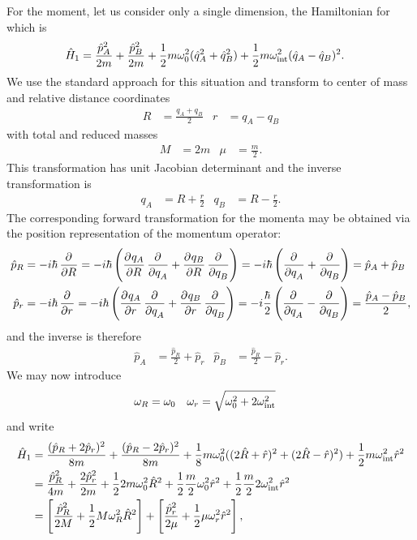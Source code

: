 For the moment, let us consider only a single dimension, the Hamiltonian for which is
\begin{align}
	\hat{H}_1
	&= \frac{\hat{p}_A^2}{2 m} + \frac{\hat{p}_B^2}{2 m}
		+ \frac{1}{2} m \omega_0^2 (\hat{q}_A^2 + \hat{q}_B^2)
		+ \frac{1}{2} m \omega_\text{int}^2 (\hat{q}_A - \hat{q}_B)^2.
\end{align}
We use the standard approach for this situation and transform to center of mass and relative distance coordinates
\begin{align}
	R
	&= \frac{q_A + q_B}{2}
	&
	r
	&= q_A - q_B
		\label{eq:oscillators-Rr}
\end{align}
with total and reduced masses
\begin{align}
	M
	&= 2 m
	&
	\mu
	&= \frac{m}{2}.
\end{align}
This transformation has unit Jacobian determinant and the inverse transformation is
\begin{align}
	q_A
	&= R + \frac{r}{2}
	&
	q_B
	&= R - \frac{r}{2}.
\end{align}
The corresponding forward transformation for the momenta may be obtained via the position representation of the momentum operator:
\begin{subequations}
\begin{align}
	\hat{p}_R
	&= -i \hbar \dpd{}{R}
	= -i \hbar \left( \dpd{q_A}{R} \dpd{}{q_A} + \dpd{q_B}{R} \dpd{}{q_B} \right)
	= -i \hbar \left( \dpd{}{q_A} + \dpd{}{q_B} \right)
	= \hat{p}_A + \hat{p}_B \\
	\hat{p}_r
	&= -i \hbar \dpd{}{r}
	= -i \hbar \left( \dpd{q_A}{r} \dpd{}{q_A} + \dpd{q_B}{r} \dpd{}{q_B} \right)
	= -i \frac{\hbar}{2} \left( \dpd{}{q_A} - \dpd{}{q_B} \right)
	= \frac{\hat{p}_A - \hat{p}_B}{2},
\end{align}
\end{subequations}
and the inverse is therefore
\begin{align}
	\hat{p}_A
	&= \frac{\hat{p}_R}{2} + \hat{p}_r
	&
	\hat{p}_B
	&= \frac{\hat{p}_R}{2} - \hat{p}_r.
\end{align}
We may now introduce
\begin{align}
	\omega_R
	&= \omega_0
	&
	\omega_r
	&= \sqrt{\omega_0^2 + 2 \omega_\text{int}^2}
\end{align}
and write
\begin{subequations}
\begin{align}
	\hat{H}_1
	&= \frac{(\hat{p}_R + 2 \hat{p}_r)^2}{8 m}
		+ \frac{(\hat{p}_R - 2 \hat{p}_r)^2}{8 m}
		+ \frac{1}{8} m \omega_0^2 ((2 \hat{R} + \hat{r})^2 + (2 \hat{R} - \hat{r})^2)
		+ \frac{1}{2} m \omega_\text{int}^2 \hat{r}^2 \\
	&= \frac{\hat{p}_R^2}{4 m} + \frac{2 \hat{p}_r^2}{2 m}
		+ \frac{1}{2} 2 m \omega_0^2 \hat{R}^2
		+ \frac{1}{2} \frac{m}{2} \omega_0^2 \hat{r}^2
		+ \frac{1}{2} \frac{m}{2} 2 \omega_\text{int}^2 \hat{r}^2 \\
	&= \left[ \frac{\hat{p}_R^2}{2 M} + \frac{1}{2} M \omega_R^2 \hat{R}^2 \right]
		+ \left[ \frac{\hat{p}_r^2}{2 \mu} + \frac{1}{2} \mu \omega_r^2 \hat{r}^2 \right],
\end{align}
\end{subequations}
